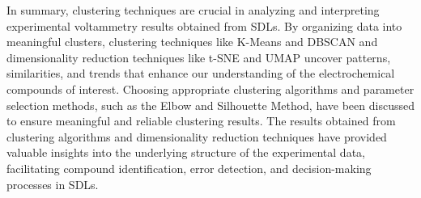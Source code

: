 In summary, clustering techniques are crucial in analyzing and interpreting experimental voltammetry results obtained from SDLs. By organizing data into meaningful clusters, clustering techniques like K-Means and DBSCAN and dimensionality reduction techniques like t-SNE and UMAP uncover patterns, similarities, and trends that enhance our understanding of the electrochemical compounds of interest. Choosing appropriate clustering algorithms and parameter selection methods, such as the Elbow and Silhouette Method, have been discussed to ensure meaningful and reliable clustering results. The results obtained from clustering algorithms and dimensionality reduction techniques have provided valuable insights into the underlying structure of the experimental data, facilitating compound identification, error detection, and decision-making processes in SDLs.
